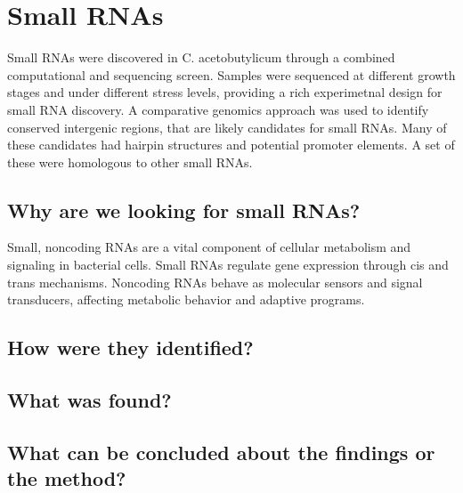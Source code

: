 
\chapter{Small RNAs}
Small RNAs were discovered in C. acetobutylicum through a combined computational and sequencing screen. Samples were sequenced at different growth stages and under different stress levels, providing a rich experimetnal design for small RNA discovery. A comparative genomics approach was used to identify conserved intergenic regions, that are likely candidates for small RNAs. Many of these candidates had hairpin structures and potential promoter elements. A set of these were homologous to other small RNAs.


\section{Why are we looking for small RNAs?}
Small, noncoding RNAs are a vital component of cellular metabolism and signaling in bacterial cells. Small RNAs regulate gene expression through cis and trans mechanisms. Noncoding RNAs behave as molecular sensors and signal transducers, affecting metabolic behavior and adaptive programs.

\section{How were they identified?}

\section{What was found?}

\section{What can be concluded about the findings or the method?}
